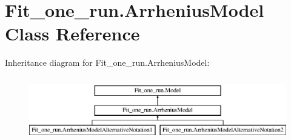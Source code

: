 \hypertarget{classFit__one__run_1_1ArrheniusModel}{\section{\-Fit\-\_\-one\-\_\-run.\-Arrhenius\-Model \-Class \-Reference}
\label{classFit__one__run_1_1ArrheniusModel}
}
\-Inheritance diagram for \-Fit\-\_\-one\-\_\-run.\-Arrhenius\-Model\-:\begin{figure}[H]
\begin{center}
\leavevmode
\includegraphics[height=2.828283cm]{classFit__one__run_1_1ArrheniusModel}
\end{center}
\end{figure}
